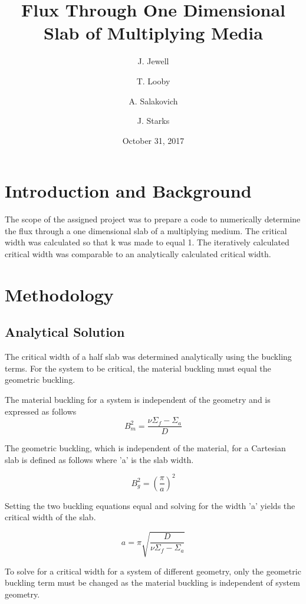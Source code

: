 \documentclass{article}
\title{Flux Through One Dimensional Slab of Multiplying Media}
\author{J. Jewell \and T. Looby \and A. Salakovich \and J. Starks}
\date{October 31, 2017}
\begin{document}
	\maketitle
	
	\section{Introduction and Background}
			The scope of the assigned project was to prepare a code to numerically determine the flux through a one dimensional slab of a multiplying medium. The critical width was calculated so that k was made to equal 1. The iteratively calculated critical width was comparable to an analytically calculated critical width. 
	\section{Methodology}
		\subsection{Analytical Solution}
			The critical width of a half slab was determined analytically using the buckling terms. For the system to be critical, the material buckling must equal the geometric buckling. 
			
			The material buckling for a system is independent of the geometry and is expressed as follows
			\begin{equation}
			B_{m}^{2}=\frac{\nu \Sigma_{f}-\Sigma_{a}}{D}
			\end{equation}
			
			The geometric buckling, which is independent of the material, for a Cartesian slab is defined as follows where 'a' is the slab width.
			
			\begin{equation}
			B_{g}^{2}=(\frac{\pi}{a})^{2}
			\end{equation}
			
			Setting the two buckling equations equal and solving for the width 'a' yields the critical width of the slab. 
			
			\begin{equation}
			a=\pi \sqrt{\frac{D}{\nu \Sigma_{f}-\Sigma_{a}}}
			\end{equation}
		
			To solve for a critical width for a system of different geometry, only the geometric buckling term must be changed as the material buckling is independent of system geometry. 
\end{document}
